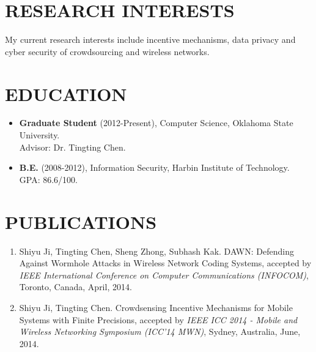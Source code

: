 \documentclass{res}
\begin{document}
\pagestyle{empty}


\address{Graduate Student\\Department of Computer Science\\Oklahoma State University}
\address{MSCS 314, Stillwater, OK 74075\\cs.okstate.edu/$\sim$shiyu\\shiyu@cs.okstate.edu}

\begin{resume}

\section{RESEARCH INTERESTS}
My current research interests include incentive mechanisms, data privacy and cyber security of crowdsourcing and wireless networks.

\section{EDUCATION}
\begin{itemize}
\item \textbf{Graduate Student} (2012-Present), Computer Science, Oklahoma State University.\\ 
Advisor: Dr. Tingting Chen.
\item \textbf{B.E.} (2008-2012), Information Security, Harbin Institute of Technology. GPA: 86.6/100.
\end{itemize}

\section{PUBLICATIONS}
\begin{enumerate}
\item Shiyu Ji, Tingting Chen, Sheng Zhong, Subhash Kak. DAWN: Defending Against Wormhole Attacks in Wireless Network Coding Systems, accepted by \emph{IEEE International Conference on Computer Communications (INFOCOM)}, Toronto, Canada, April, 2014.

\item Shiyu Ji, Tingting Chen. Crowdsensing Incentive Mechanisms for Mobile Systems with Finite Precisions, accepted by \emph{IEEE ICC 2014 - Mobile and Wireless Networking Symposium (ICC'14 MWN)}, Sydney, Australia, June, 2014.


\end{enumerate}
\end{resume}
\end{document}
